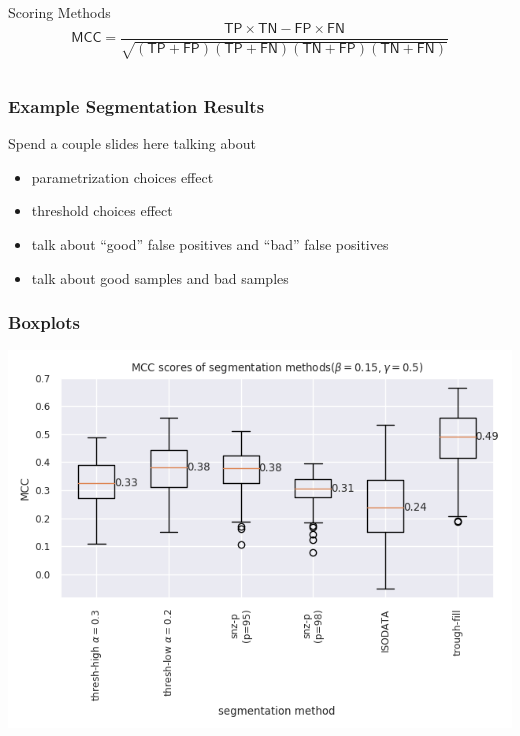 \documentclass[9pt,notes]{beamer}
\newcommand{\TN}{\mathsf{TN}}
\newcommand{\TP}{\mathsf{TP}}
\newcommand{\FN}{\mathsf{FN}}
\newcommand{\FP}{\mathsf{FP}}
\begin{document}
\begin{frame}
\begin{columns}
\begin{column}{0.6\textwidth}
\begin{block}{Scoring Methods}
\begin{equation*}
\textsf{MCC} = \frac{\TP\times \TN - \FP \times \FN}{\sqrt{ (\TP+\FP)(\TP+\FN)(\TN+\FP)(\TN+\FN)}}
\end{equation*}
\end{block}
  \end{column}
\end{columns}
\end{frame}

\begin{frame}
\frametitle{Example Segmentation Results}
Spend a couple slides here talking about
\begin{itemize}
  \item parametrization choices effect
  \item threshold choices effect
  \item talk about ``good'' false positives and  ``bad'' false positives
  \item talk about good samples and bad samples
\end{itemize}
\end{frame}

\begin{frame}
\frametitle{Boxplots}
\begin{center}
\includegraphics[height=0.8\textheight]{190408-all-MCC-boxplot-semistrict}
\end{center}
\end{frame}
\end{document}
